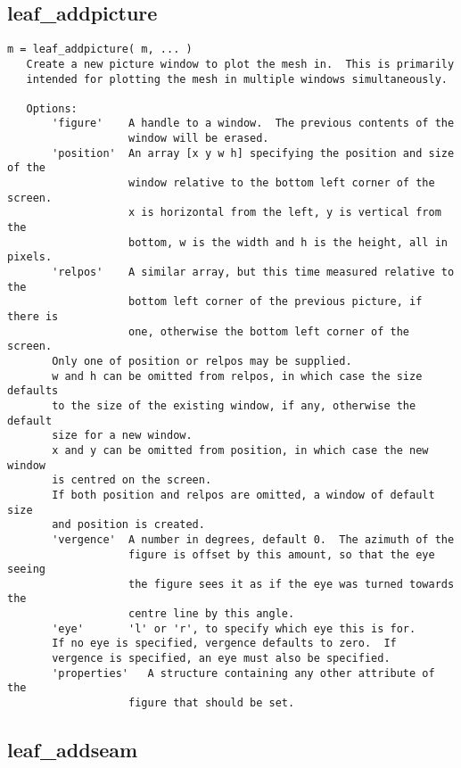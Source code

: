\subsection{leaf\_addpicture}\label{section-leaf-addpicture}

\begin{verbatim}
m = leaf_addpicture( m, ... )
   Create a new picture window to plot the mesh in.  This is primarily
   intended for plotting the mesh in multiple windows simultaneously.

   Options:
       'figure'    A handle to a window.  The previous contents of the
                   window will be erased.
       'position'  An array [x y w h] specifying the position and size of the
                   window relative to the bottom left corner of the screen.
                   x is horizontal from the left, y is vertical from the
                   bottom, w is the width and h is the height, all in pixels.
       'relpos'    A similar array, but this time measured relative to the
                   bottom left corner of the previous picture, if there is
                   one, otherwise the bottom left corner of the screen.
       Only one of position or relpos may be supplied.
       w and h can be omitted from relpos, in which case the size defaults
       to the size of the existing window, if any, otherwise the default
       size for a new window.
       x and y can be omitted from position, in which case the new window
       is centred on the screen.
       If both position and relpos are omitted, a window of default size
       and position is created.
       'vergence'  A number in degrees, default 0.  The azimuth of the
                   figure is offset by this amount, so that the eye seeing
                   the figure sees it as if the eye was turned towards the
                   centre line by this angle.
       'eye'       'l' or 'r', to specify which eye this is for.
       If no eye is specified, vergence defaults to zero.  If
       vergence is specified, an eye must also be specified.
       'properties'   A structure containing any other attribute of the
                   figure that should be set.
\end{verbatim}

\subsection{leaf\_addseam}\label{section-leaf-addseam}

